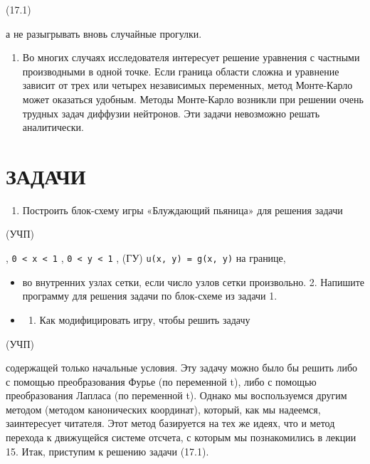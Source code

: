\documentclass[
  ukrainian,
]{article}
\providecommand{\tightlist}{%
  \setlength{\itemsep}{0pt}\setlength{\parskip}{0pt}}
\begin{document}
(17.1)

а не разыгрывать вновь случайные прогулки.

\begin{enumerate}
\def\labelenumi{\arabic{enumi}.}
\setcounter{enumi}{1}
\tightlist
\item
  Во многих случаях исследователя интересует решение уравнения с
  частными производными в одной точке. Если граница области сложна и
  уравнение зависит от трех или четырех независимых переменных, метод
  Монте-Карло может оказаться удобным. Методы Монте-Карло возникли при
  решении очень трудных задач диффузии нейтронов. Эти задачи невозможно
  решать аналитически.
\end{enumerate}

\section{ЗАДАЧИ}\label{ux437ux430ux434ux430ux447ux438-3}

\begin{enumerate}
\def\labelenumi{\arabic{enumi}.}
\tightlist
\item
  Построить блок-схему игры «Блуждающий пьяница» для решения задачи
\end{enumerate}

(УЧП)

, \texttt{0\ \textless{}\ x\ \textless{}\ 1} ,
\texttt{0\ \textless{}\ y\ \textless{}\ 1} , (ГУ)
\texttt{u(x,\ y)\ =\ g(x,\ y)} на границе,

\begin{itemize}
\tightlist
\item
  во внутренних узлах сетки, если число узлов сетки произвольно. 2.
  Напишите программу для решения задачи по блок-схеме из задачи 1.
\item
  \begin{enumerate}
  \def\labelenumi{\arabic{enumi}.}
  \setcounter{enumi}{2}
  \tightlist
  \item
    Как модифицировать игру, чтобы решить задачу
  \end{enumerate}
\end{itemize}

(УЧП)

содержащей только начальные условия. Эту задачу можно было бы решить
либо с помощью преобразования Фурье (по переменной t), либо с помощью
преобразования Лапласа (по переменной t). Однако мы воспользуемся другим
методом (методом канонических координат), который, как мы надеемся,
заинтересует читателя. Этот метод базируется на тех же идеях, что и
метод перехода к движущейся системе отсчета, с которым мы познакомились
в лекции 15. Итак, приступим к решению задачи (17.1).
\end{document}
